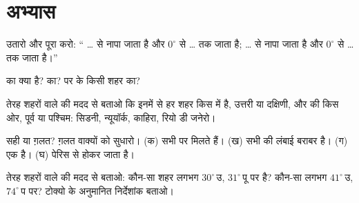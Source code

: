 \section{अभ्यास}

\begin{exercise}[$\star$]\label{exo:g6:latitude-longitude:1}
उतारो और पूरा करो: `` \ldots{} से नापा जाता है और
$0^\circ$ से \ldots{} तक जाता है;  \ldots{}  से नापा जाता है और
$0^\circ$ से \ldots{} तक जाता है।''
\end{exercise}

\begin{exercise}[$\star$]\label{exo:g6:latitude-longitude:2}
 का  क्या है?  का?  पर के किसी
शहर का?
\end{exercise}

\begin{exercise}[$\star$]\label{exo:g6:latitude-longitude:3}
तेरह शहरों वाले  की मदद से बताओ कि इनमें से हर शहर किस  में है, उत्तरी
या दक्षिणी, और  की किस ओर, पूर्व या पश्चिम: सिडनी, न्यूयॉर्क,
काहिरा, रियो डी जनेरो।
\end{exercise}

\begin{exercise}[$\star$]\label{exo:g6:latitude-longitude:4}
सही या ग़लत? ग़लत वाक्यों को सुधारो।
(क) सभी   पर मिलते हैं।
(ख) सभी  की लंबाई बराबर है।
(ग)  एक  है।
(घ)  पेरिस से होकर जाता है।
\end{exercise}

\begin{exercise}[$\star\star$]\label{exo:g6:latitude-longitude:5}
तेरह शहरों वाले  की मदद से बताओ: कौन-सा शहर लगभग
$30^\circ$\,उ, $31^\circ$\,पू पर है? कौन-सा लगभग $41^\circ$\,उ,
$74^\circ$\,प पर? टोक्यो के अनुमानित निर्देशांक बताओ।
\end{exercise}

